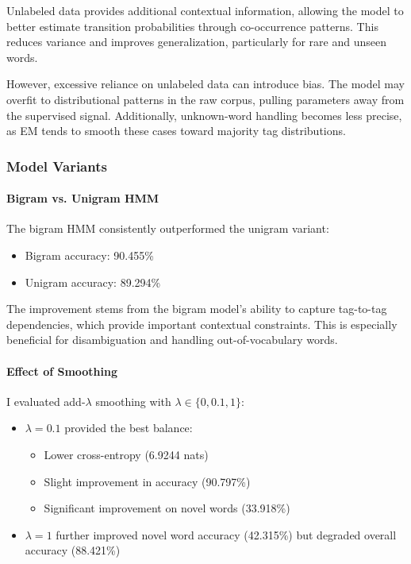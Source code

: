\documentclass{article}
\begin{document}
Unlabeled data provides additional contextual information, allowing the model to better estimate transition probabilities through co-occurrence patterns. This reduces variance and improves generalization, particularly for rare and unseen words.

However, excessive reliance on unlabeled data can introduce bias. The model may overfit to distributional patterns in the raw corpus, pulling parameters away from the supervised signal. Additionally, unknown-word handling becomes less precise, as EM tends to smooth these cases toward majority tag distributions.

\subsubsection{Model Variants}

\paragraph{Bigram vs. Unigram HMM}

The bigram HMM consistently outperformed the unigram variant:

\begin{itemize}
    \item Bigram accuracy: 90.455\%
    \item Unigram accuracy: 89.294\%
\end{itemize}

The improvement stems from the bigram model’s ability to capture tag-to-tag dependencies, which provide important contextual constraints. This is especially beneficial for disambiguation and handling out-of-vocabulary words.

\paragraph{Effect of Smoothing}

I evaluated add-$\lambda$ smoothing with $\lambda \in \{0, 0.1, 1\}$:

\begin{itemize}
    \item $\lambda = 0.1$ provided the best balance:
    \begin{itemize}
        \item Lower cross-entropy (6.9244 nats)
        \item Slight improvement in accuracy (90.797\%)
        \item Significant improvement on novel words (33.918\%)
    \end{itemize}
    \item $\lambda = 1$ further improved novel word accuracy (42.315\%) but degraded overall accuracy (88.421\%)
\end{itemize}
\end{document}
